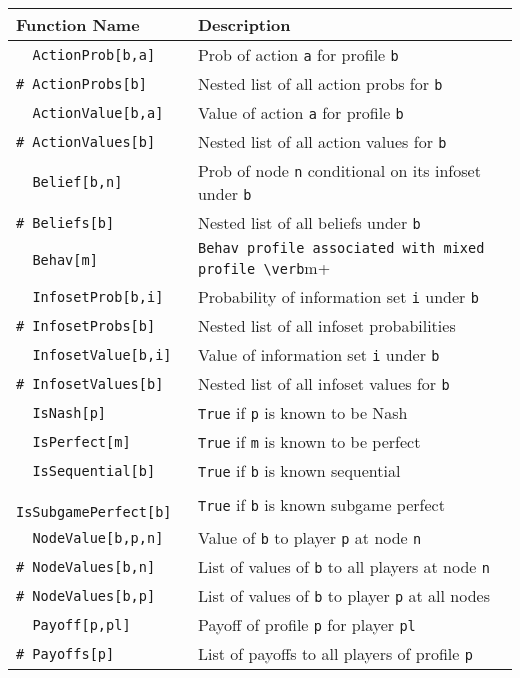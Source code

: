 \begin{table}[htp]
\begin{center}
\begin{tabular} {|l||l|} \hline
Function Name	& Description \\ 
\hline
\verb+  ActionProb[b,a]+ & Prob of action \verb+a+ for profile \verb+b+\\
\verb+# ActionProbs[b]+ & Nested list of all action probs for \verb+b+ \\ 
\verb+  ActionValue[b,a]+ & Value of action \verb+a+ for profile \verb+b+\\ 
\verb+# ActionValues[b]+ & Nested list of all action values for \verb+b+ \\ 
\verb+  Belief[b,n]+ & Prob of node \verb+n+ conditional on its
infoset under \verb+b+\\ 
\verb+# Beliefs[b]+ & Nested list of all beliefs under \verb+b+\\ 
\verb+  Behav[m]+ & \verb+Behav profile associated with mixed profile \verb+m+\\
\verb+  InfosetProb[b,i]+ & Probability of information set \verb+i+
under \verb+b+\\ 
\verb+# InfosetProbs[b]+ & Nested list of all infoset probabilities\\
\verb+  InfosetValue[b,i]+ & Value of information set \verb+i+
under \verb+b+\\ 
\verb+# InfosetValues[b]+ & Nested list of all infoset values
for \verb+b+\\ 
\verb+  IsNash[p]+ &\verb+True+ if \verb+p+ is known to be Nash\\
\verb+  IsPerfect[m]+ &\verb+True+ if \verb+m+ is known to be perfect\\
\verb+  IsSequential[b]+ &\verb+True+ if \verb+b+ is known sequential\\
\verb+  IsSubgamePerfect[b]+ &  \verb+True+ if \verb+b+ is known subgame perfect\\ 
\verb+  NodeValue[b,p,n]+ & Value of \verb+b+ to player \verb+p+ at
node \verb+n+\\ 
\verb+# NodeValues[b,n]+ & List of values of \verb+b+ to all players at node \verb+n+\\
\verb+# NodeValues[b,p]+ & List of values of \verb+b+ to player \verb+p+ at all nodes\\
\verb+  Payoff[p,pl]+ & Payoff of profile \verb+p+ for player \verb+pl+\\
\verb+# Payoffs[p]+ & List of payoffs to all players of profile \verb+p+\\

\end{tabular}
\end{center}
\end{table}
